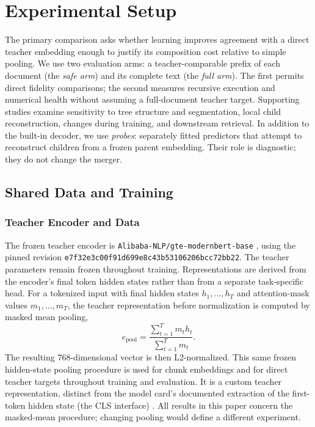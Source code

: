 \documentclass[10pt]{article}
\begin{document}
\section{Experimental Setup}
\label{sec:experimental-setup}

The primary comparison asks whether learning improves agreement with a direct
teacher embedding enough to justify its composition cost relative to simple
pooling. We use two evaluation arms: a teacher-comparable prefix of each
document (the \emph{safe arm}) and its complete text (the \emph{full arm}). The
first permits direct fidelity comparisons; the second measures recursive
execution and numerical health without assuming a full-document teacher target.
Supporting studies examine sensitivity to tree structure and segmentation,
local child reconstruction, changes during training, and downstream retrieval.
In addition to the built-in decoder, we use \emph{probes}: separately fitted
predictors that attempt to reconstruct children from a frozen parent embedding.
Their role is diagnostic; they do not change the merger.

\subsection{Shared Data and Training}

\subsubsection{Teacher Encoder and Data}
\label{sec:teacher-data}

The frozen teacher encoder is \texttt{Alibaba-NLP/gte-modernbert-base} \citep{alibaba-nlp-gte-modernbert}, using
the pinned revision
\nolinkurl{e7f32e3c00f91d699e8c43b53106206bcc72bb22}. The teacher parameters remain
frozen throughout training. Representations are derived from the encoder's final
token hidden states rather than from a separate task-specific head. For a
tokenized input with final hidden states \(h_1,\ldots,h_T\) and attention-mask
values \(m_1,\ldots,m_T\), the teacher representation before normalization is
computed by masked mean pooling,
\[
e_{\mathrm{pool}}
=
\frac{\sum_{t=1}^{T} m_t h_t}
{\sum_{t=1}^{T} m_t}.
\]
The resulting 768-dimensional vector is then L2-normalized. This same frozen
hidden-state pooling procedure is used for chunk embeddings and for direct
teacher targets throughout training and evaluation. It is a custom teacher
representation, distinct from the model card's documented extraction of the
first-token hidden state (the CLS interface) \citep{alibaba-nlp-gte-modernbert}.
All results in this paper concern the masked-mean procedure; changing pooling
would define a different experiment.
\end{document}

